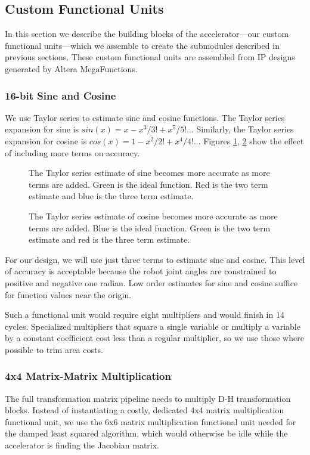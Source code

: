 \subsection{Custom Functional Units}
In this section we describe the building blocks of the accelerator---our custom functional units---which we assemble to create the submodules described in previous sections. These custom functional units are assembled from IP designs generated by Altera MegaFunctions.

\subsubsection{16-bit Sine and Cosine}
We use Taylor series to estimate sine and cosine functions. The Taylor series expansion for sine is $sin(x) = x - x^3/3! + x^5/5!$... Similarly, the Taylor series expansion for cosine is $cos(x) = 1 - x^2/2! + x^4/4!$... Figures  \ref{fig:sine}, \ref{fig:cosine} show the effect of including more terms on accuracy.

\begin{figure}[ht]
\center
{}
\caption{The Taylor series estimate of sine becomes more accurate as more terms are added. Green is the ideal function. Red is the two term estimate and blue is the three term estimate.}
\label{fig:sine}
\end{figure}

\begin{figure}[ht]
\center
{}
\caption{The Taylor series estimate of cosine becomes more accurate as more terms are added. Blue is the ideal function. Green is the two term estimate and red is the three term estimate.}
\label{fig:cosine}
\end{figure}

For our design, we will use just three terms to estimate sine and cosine. This level of accuracy is acceptable because the robot joint angles are constrained to positive and negative one radian. Low order estimates for sine and cosine suffice for function values near the origin.

Such a functional unit would require eight multipliers and would finish in 14 cycles. Specialized multipliers that square a single variable or multiply a variable by a constant coefficient cost less than a regular multiplier, so we use those where possible to trim area costs.

\subsubsection{4x4 Matrix-Matrix Multiplication}
The full transformation matrix pipeline needs to multiply D-H transformation blocks. Instead of instantiating a costly, dedicated 4x4 matrix multiplication functional unit, we use the 6x6 matrix multiplication functional unit needed for the damped least squared algorithm, which would otherwise be idle while the accelerator is finding the Jacobian matrix.

